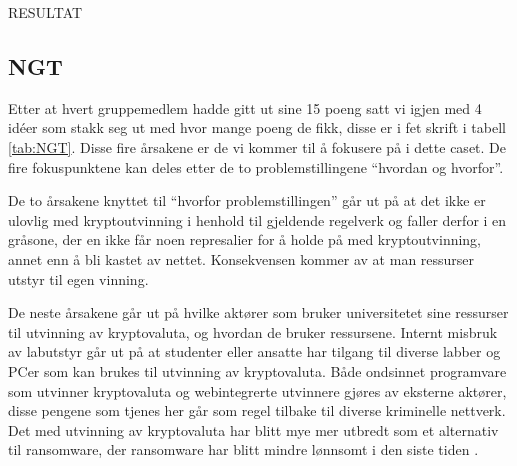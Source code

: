 RESULTAT

\subsection{NGT}
Etter at hvert gruppemedlem hadde gitt ut sine 15 poeng satt vi igjen med 4 idéer som stakk seg ut med hvor mange poeng de fikk, disse er i fet skrift i tabell \ref{tab:NGT}. Disse fire årsakene er de vi kommer til å fokusere på i dette caset. De fire fokuspunktene kan deles etter de to problemstillingene ``hvordan og hvorfor''.

De to årsakene knyttet til ``hvorfor problemstillingen'' går ut på at det ikke er ulovlig med kryptoutvinning i henhold til gjeldende regelverk og faller derfor i en gråsone, der en ikke får noen represalier for å holde på med kryptoutvinning, annet enn å bli kastet av nettet. Konsekvensen kommer av at man ressurser utstyr til egen vinning.

De neste årsakene går ut på hvilke aktører som bruker universitetet sine ressurser til utvinning av kryptovaluta, og hvordan de bruker ressursene. Internt misbruk av labutstyr går ut på at studenter eller ansatte har tilgang til diverse labber og PCer som kan brukes til utvinning av kryptovaluta. Både ondsinnet programvare som utvinner kryptovaluta og webintegrerte utvinnere gjøres av eksterne aktører, disse pengene som tjenes her går som regel tilbake til diverse kriminelle nettverk. Det med utvinning av kryptovaluta har blitt mye mer utbredt som et alternativ til ransomware, der ransomware har blitt mindre lønnsomt i den siste tiden \cite{RW}.


